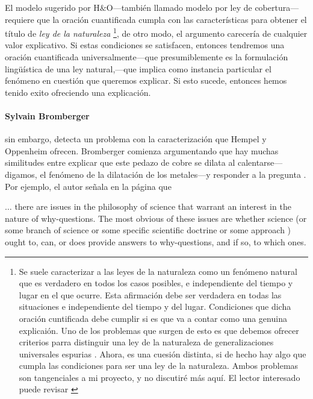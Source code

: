 El modelo sugerido por H$\&$O---también llamado modelo
por ley de cobertura---requiere que la oración
cuantificada cumpla con las características para
obtener el título de \emph{ ley de la naturaleza }
\footnote{
	Se suele caracterizar a las leyes de la naturaleza
	como un fenómeno natural que es verdadero en todos
	los casos posibles, e	independiente del tiempo y
	lugar en el que ocurre. Esta afirmación debe ser
	verdadera en todas las situaciones e independiente
	del tiempo y del lugar. Condiciones que dicha
	oración cuntificada debe	cumplir si es que va a
	contar como una genuina explicaión. Uno de los
	problemas que surgen de esto es que debemos
	ofrecer criterios parra distinguir una ley de la
	naturaleza de generalizaciones	universales
	espurias \parencite{ Nagel1962 }. Ahora, es una
	cuesión distinta, si de hecho hay algo que cumpla
	las condiciones para ser una ley de la naturaleza.
	Ambos problemas son tangenciales a mi	proyecto,
	y no discutiré más aquí. El lector interesado
	puede	revisar	\parencite{ sep-laws-of-nature }
}, de otro modo, el argumento carecería de cualquier
valor explicativo. Si estas condiciones se satisfacen,
entonces tendremos una oración cuantificada
universalmente---que presumiblemente es la
formulación lingüística de una ley natural,---que
implica como instancia particular el fenómeno en
cuestión que queremos explicar. Si esto sucede,
entonces hemos tenido exito ofreciendo una
explicación.

\paragraph{ Sylvain Bromberger \parencite{
Bromberger1966, } } sin embargo, detecta un problema
con la caracterización que Hempel y Oppenheim ofrecen.
Bromberger comienza argumentando que hay muchas
similitudes entre explicar que este pedazo de cobre se
dilata al calentarse---digamos, el fenómeno de la
dilatación de los metales---y responder a la pregunta
. Por ejemplo, el autor señala en la página
que

    \begin{ quote }
    $\ldots$ there are issues in the philosophy of
	science that warrant an interest in the nature of
	why-questions.	The most obvious of these issues
	are whether science (or some branch of science or
	some specific scientific doctrine or some approach
	) ought to, can, or does provide answers to
	why-questions, and if so,
	to which ones.
	\end{ quote }

